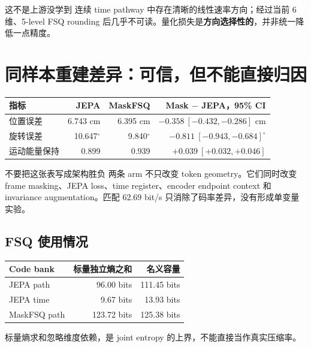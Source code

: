 \documentclass[10pt,a4paper,fontset=none]{ctexart}
\begin{document}
\begin{insightbox}{这不是上游没学到}
连续 time pathway 中存在清晰的线性速率方向；经过当前 6 维、5-level FSQ rounding 后几乎不可读。量化损失是\textbf{方向选择性的}，并非统一降低一点精度。
\end{insightbox}

\section{同样本重建差异：可信，但不能直接归因}

\begin{tabularx}{\linewidth}{@{}lRRR@{}}
\toprule
指标 & JEPA & MaskFSQ & Mask $-$ JEPA，95\% CI \\
\midrule
位置误差 & 6.743 cm & 6.395 cm & $-0.358\ [-0.432,-0.286]$ cm \\
旋转误差 & 10.647$^\circ$ & 9.840$^\circ$ & $-0.811\ [-0.943,-0.684]^\circ$ \\
运动能量保持 & 0.899 & 0.939 & $+0.039\ [+0.032,+0.046]$ \\
\bottomrule
\end{tabularx}

\vspace{7mm}
\begin{darkbox}{不要把这张表写成架构胜负}
两条 arm 不只改变 token geometry。它们同时改变 frame masking、JEPA loss、time register、encoder endpoint context 和 invariance augmentation。匹配 62.69 bit/s 只消除了码率差异，没有形成单变量实验。
\end{darkbox}

\subsection{FSQ 使用情况}

\begin{tabularx}{\linewidth}{@{}lRR@{}}
\toprule
Code bank & 标量独立熵之和 & 名义容量 \\
\midrule
JEPA path & 96.00 bits & 111.45 bits \\
JEPA time & 9.67 bits & 13.93 bits \\
MaskFSQ path & 123.72 bits & 125.38 bits \\
\bottomrule
\end{tabularx}

\smallskip
{\footnotesize\color{ArenaMid}标量熵求和忽略维度依赖，是 joint entropy 的上界，不能直接当作真实压缩率。}
\end{document}

